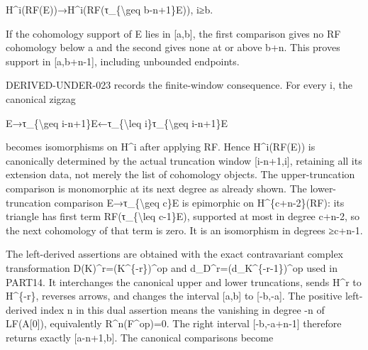 \documentclass[11pt]{article}
\begin{document}
H\textasciicircum{}i(RF(E)\allowbreak{})\allowbreak{}\allowbreak{}→H\textasciicircum{}i(RF(τ\_\allowbreak{}\{\textbackslash{}geq b-n\allowbreak{}+1\}E)\allowbreak{})\allowbreak{},\allowbreak{} i≥b.

If the cohomology support of E lies in [a,\allowbreak{}b]\allowbreak{},\allowbreak{} the first comparison gives no RF cohomology below a and the second gives none at or above b\allowbreak{}+n. This proves support in [a,\allowbreak{}b\allowbreak{}+n-1]\allowbreak{},\allowbreak{} including unbounded endpoints.

DERIVED-UNDER-023 records the finite-window consequence. For every i,\allowbreak{} the canonical zigzag

E\allowbreak{}→τ\_\allowbreak{}\{\textbackslash{}geq i-n\allowbreak{}+1\}E←τ\_\allowbreak{}\{\textbackslash{}leq i\}τ\_\allowbreak{}\{\textbackslash{}geq i-n\allowbreak{}+1\}E

becomes isomorphisms on H\^{}i after applying RF. Hence H\textasciicircum{}i(RF(E)\allowbreak{})\allowbreak{} is canonically determined by the actual truncation window [i-n\allowbreak{}+1,\allowbreak{}i]\allowbreak{},\allowbreak{} retaining all its extension data,\allowbreak{} not merely the list of cohomology objects. The upper-truncation comparison is monomorphic at its next degree as already shown. The lower-truncation comparison E\allowbreak{}→τ\_\allowbreak{}\{\textbackslash{}geq c\}E is epimorphic on H\textasciicircum{}\{c\allowbreak{}+n-2\}(RF)\allowbreak{}:\allowbreak{} its triangle has first term RF(τ\_\allowbreak{}\{\textbackslash{}leq c-1\}E)\allowbreak{},\allowbreak{} supported at most in degree c\allowbreak{}+n-2,\allowbreak{} so the next cohomology of that term is zero. It is an isomorphism in degrees ≥c\allowbreak{}+n-1.

The left-derived assertions are obtained with the exact contravariant complex transformation D(K)\allowbreak{}\textasciicircum{}r\allowbreak{}=(K\textasciicircum{}\{-r\})\allowbreak{}\textasciicircum{}op and d\_\allowbreak{}D\textasciicircum{}r\allowbreak{}=(d\_\allowbreak{}K\textasciicircum{}\{-r-1\})\allowbreak{}\textasciicircum{}op used in PART14. It interchanges the canonical upper and lower truncations,\allowbreak{} sends H\^{}r to H\textasciicircum{}\{-r\},\allowbreak{} reverses arrows,\allowbreak{} and changes the interval [a,\allowbreak{}b]\allowbreak{} to [-b,\allowbreak{}-a]\allowbreak{}. The positive left-derived index n in this dual assertion means the vanishing in degree -n of LF(A[0]\allowbreak{})\allowbreak{},\allowbreak{} equivalently R\textasciicircum{}n(F\textasciicircum{}op)\allowbreak{}\allowbreak{}=0. The right interval [-b,\allowbreak{}-a\allowbreak{}+n-1]\allowbreak{} therefore returns exactly [a-n\allowbreak{}+1,\allowbreak{}b]\allowbreak{}. The canonical comparisons become
\end{document}
